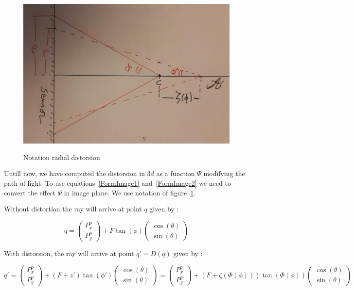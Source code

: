 \begin{figure}
\centering
	\includegraphics[width=12cm]{Methods/Images/RadialInThePlane.jpg} \\
	\caption{Notation radial distorsion}
	\label{fig:RadInPlane}
\end{figure}

Untill now, we have computed the distorsion in $3d$ as a function $\Psi$ modifying the path of light. To use 
equations~\ref{FormImage1} and~\ref{FormImage2} we need to convert the effect $\Psi$  in image plane.
We use notation of figure~\ref{fig:RadInPlane}.


Without distortion the ray will arrive at point $q$  given by :

\begin{equation}
	q =     \begin{pmatrix} P^p_x \\ P^p_y \end{pmatrix} +  F \tan(\phi)   \begin{pmatrix} \cos(\theta) \\ \sin(\theta) \end{pmatrix} 
\end{equation}

With distorsion, the ray will arrive at point $q' = D(q)$ given by :

\begin{equation}
	q' =     \begin{pmatrix} P^p_x \\ P^p_y \end{pmatrix} +  (F+z') \tan(\phi')   \begin{pmatrix} \cos(\theta) \\ \sin(\theta) \end{pmatrix} 
		=     \begin{pmatrix} P^p_x \\ P^p_y \end{pmatrix} +  (F+\zeta(\Phi(\phi))) \tan(\Phi(\phi))   \begin{pmatrix} \cos(\theta) \\ \sin(\theta) \end{pmatrix} 
\end{equation}

